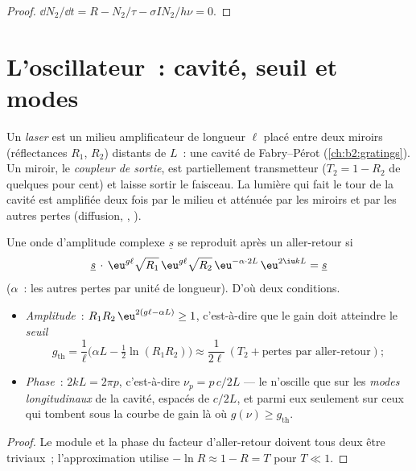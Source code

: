 \begin{proof}
$\dd N_2/\dd t = R - N_2/\tau - \sigma I N_2/h\nu = 0$.
\end{proof}

\section{L'oscillateur~: cavité, seuil et modes}

\begin{definition}\label{def:b2:laser:cavity}
Un \emph{laser} est un milieu amplificateur de longueur $\ell$
placé entre deux miroirs (réflectances $R_1$, $R_2$) distants de $L$~:
une cavité de Fabry--Pérot (\cref{ch:b2:gratings}). Un miroir, le
\emph{coupleur de sortie}, est partiellement transmetteur ($T_2 = 1 - R_2$ de quelques
pour cent) et laisse sortir le faisceau. La lumière qui fait le tour de la cavité est
amplifiée deux fois par le milieu et atténuée par les miroirs et par les
autres pertes (diffusion, , ).
\end{definition}

\begin{theorem}\label{thm:b2:laser:threshold}
Une onde d'amplitude complexe $\underline s$ se reproduit après un
aller-retour si
\[
\underline s\,\cdot\, \eu^{g\ell}\sqrt{R_1}\,\eu^{g\ell}\sqrt{R_2}\,
\eu^{-\alpha\cdot 2L}\,\eu^{2\iu kL} = \underline s
\]
($\alpha$~: les autres pertes par unité de longueur). D'où deux conditions.
\begin{itemize}
\item \emph{Amplitude}~: $R_1R_2\,\eu^{2(g\ell - \alpha L)} \ge 1$, c'est-à-dire que le
      gain doit atteindre le \emph{seuil}
      \[
      g_{\text{th}} = \frac{1}{\ell}\Big(\alpha L - \tfrac12\ln(R_1R_2)\Big)
      \approx \frac{1}{2\ell}\,(T_2 + \text{pertes par aller-retour}) ;
      \]
\item \emph{Phase}~: $2kL = 2\pi p$, c'est-à-dire $\nu_p = p\,c/2L$ --- le 
      n'oscille que sur les \emph{modes longitudinaux} de la cavité, espacés de $c/2L$, et parmi eux seulement sur
      ceux qui tombent sous la courbe de gain là où $g(\nu) \ge g_{\text{th}}$.
\end{itemize}
\end{theorem}

\begin{proof}
Le module et la phase du facteur d'aller-retour doivent tous deux être triviaux~;
l'approximation utilise $-\ln R \approx 1 - R = T$ pour $T \ll 1$.
\end{proof}


